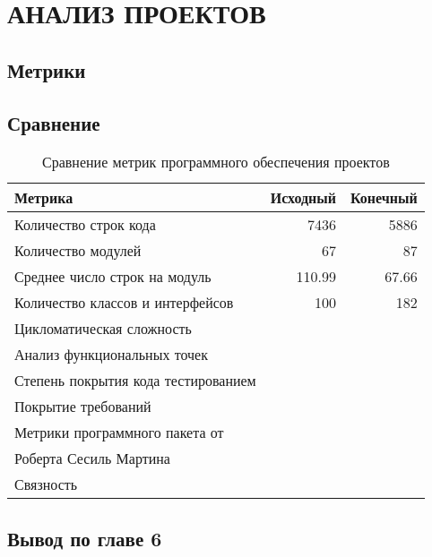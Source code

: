 \section{АНАЛИЗ ПРОЕКТОВ}
    \subsection{Метрики}

    \subsection{Сравнение}
    
    \begin{table}[!h]
        \caption{Сравнение метрик программного обеспечения проектов}
        \begin{center}
            \begin{tabular}{l|r|r}
                \textbf{Метрика} & \textbf{Исходный} & \textbf{Конечный} \\
                \hline
                Количество строк кода               & 7436 & 5886 \\
                Количество модулей                  & 67 & 87 \\
                Среднее число строк на модуль       & 110.99 & 67.66 \\
                Количество классов и интерфейсов    & 100 & 182 \\
                Цикломатическая сложность           & & \\
                Анализ функциональных точек         & & \\
                Степень покрытия кода тестированием & & \\
                Покрытие требований                 & & \\
                Метрики программного пакета от      & & \\
                Роберта Сесиль Мартина              & & \\
                Связность                           & & \\
            \end{tabular}
        \end{center}
    \end{table}

    \subsection*{Вывод по главе 6}
